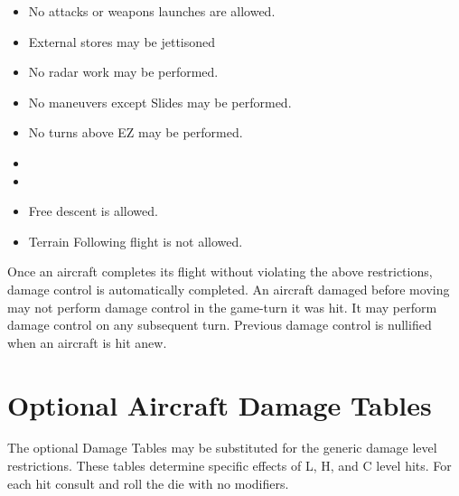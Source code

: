 \begin{advancedrules}
\begin{itemize}
    \item No attacks or weapons launches are allowed.
    \item External stores may be jettisoned
    \item No radar work may be performed.
    \item No maneuvers except Slides may be performed.
    \item No turns above EZ may be performed.
    \item {}
    \item {}
    \item Free descent is allowed.
    \item Terrain Following flight is not allowed.
\end{itemize}

Once an aircraft completes its flight without violating the above restrictions, damage control is automatically completed. An aircraft damaged before moving may not perform damage control in the game-turn it was hit. It may perform damage control on any subsequent turn. Previous damage control is nullified when an aircraft is hit anew.

\section{Optional Aircraft Damage Tables}


The optional Damage Tables may be substituted for the generic damage level restrictions. These tables determine specific effects of L, H, and C level hits. For each hit consult  and roll the die with no modifiers.  


\end{advancedrules}
